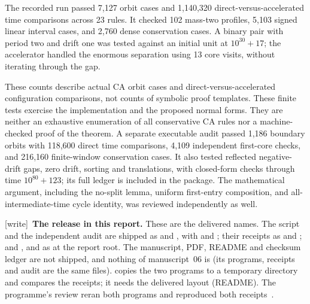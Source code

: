 \documentclass[11pt,letterpaper]{article}
\numberwithin{equation}{section}
\theoremstyle{definition}
\theoremstyle{remark}
\newcommand{\wtag}{\textup{[write]}}
\begin{document}
The recorded run passed 7,127 orbit cases and 1,140,320 direct-versus-accelerated
time comparisons across 23 rules. It checked 102 mass-two profiles, 5,103 signed
linear interval cases, and 2,760 dense conservation cases. A binary pair with
period two and drift one was tested against an initial unit at
$10^{30}+17$; the accelerator handled the enormous separation using 13 core
visits, without iterating through the gap.

These counts describe actual CA orbit cases and direct-versus-accelerated
configuration comparisons, not counts of symbolic proof templates.
These finite tests exercise the implementation and the proposed normal forms.
They are neither an exhaustive enumeration of all conservative CA rules nor a
machine-checked proof of the theorem. A separate executable audit
passed 1,186 boundary orbits with 118,600 direct time comparisons, 4,109
independent first-core checks, and 216,160 finite-window conservation cases.
It also tested reflected negative-drift gaps, zero drift, sorting and
translations, with closed-form checks through time $10^{80}+123$; its full
ledger is included in the package. The mathematical argument, including the
no-split lemma, uniform first-entry composition, and all-intermediate-time
cycle identity, was reviewed independently as well.

\wtag\ \textbf{The release in this report.} These are the delivered names. The script and the independent audit are shipped as  and , with  and ; their receipts as  and ; and ,  and  as  at the report root. The manuscript, PDF, README and checksum ledger are not shipped, and nothing of manuscript~06 is (its programs, receipts and audit are the same files).  copies the two programs to a temporary directory and compares the receipts; it needs the delivered layout (README). The programme's review reran both programs and reproduced both receipts~\cite{reviewlowmass}.
\end{document}
